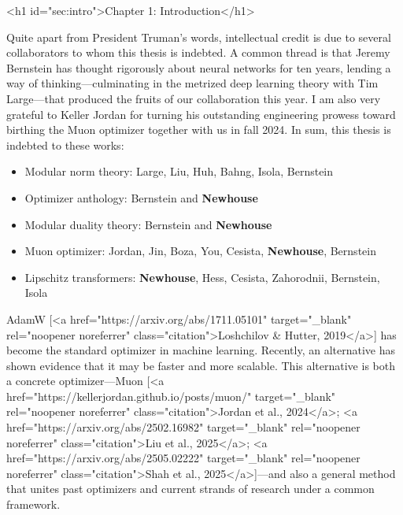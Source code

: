 <h1 id="sec:intro">Chapter 1: Introduction</h1>

\begin{notebox}
Quite apart from President Truman's words, intellectual credit is due to several collaborators to whom this thesis is indebted. A common thread is that Jeremy Bernstein has thought rigorously about neural networks for ten years, lending a way of thinking---culminating in the metrized deep learning theory with Tim Large---that produced the fruits of our collaboration this year. I am also very grateful to Keller Jordan for turning his outstanding engineering prowess toward birthing the Muon optimizer together with us in fall 2024. In sum, this thesis is indebted to these works:
\begin{itemize}
    \item Modular norm theory: Large, Liu, Huh, Bahng, Isola, Bernstein
    \item Optimizer anthology: Bernstein and \textbf{Newhouse}
    \item Modular duality theory: Bernstein and \textbf{Newhouse}
    \item Muon optimizer: Jordan, Jin, Boza, You, Cesista, \textbf{Newhouse}, Bernstein
    \item Lipschitz transformers: \textbf{Newhouse}, Hess, Cesista, Zahorodnii, Bernstein, Isola
\end{itemize}
\end{notebox}

\vspace{0.5em}

AdamW [<a href="https://arxiv.org/abs/1711.05101" target="_blank" rel="noopener noreferrer" class="citation">Loshchilov & Hutter, 2019</a>] has become the standard optimizer in machine learning. Recently, an alternative has shown evidence that it may be faster and more scalable. This alternative is both a concrete optimizer---Muon [<a href="https://kellerjordan.github.io/posts/muon/" target="_blank" rel="noopener noreferrer" class="citation">Jordan et al., 2024</a>; <a href="https://arxiv.org/abs/2502.16982" target="_blank" rel="noopener noreferrer" class="citation">Liu et al., 2025</a>; <a href="https://arxiv.org/abs/2505.02222" target="_blank" rel="noopener noreferrer" class="citation">Shah et al., 2025</a>]---and also a general method that unites past optimizers and current strands of research under a common framework.

